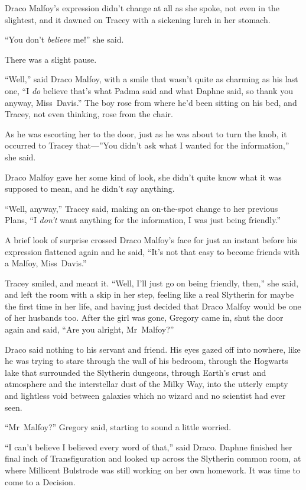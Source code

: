Draco Malfoy’s expression didn’t change at all as she spoke, not even in the
slightest, and it dawned on Tracey with a sickening lurch in her stomach.

“You don’t \emph{believe} me!” she said.

There was a slight pause.

“Well,” said Draco Malfoy, with a smile that wasn’t quite as charming as his
last one, “I \emph{do} believe that’s what Padma said and what Daphne said, so
thank you anyway, Miss~Davis.” The boy rose from where he’d been sitting on his
bed, and Tracey, not even thinking, rose from the chair.

As he was escorting her to the door, just as he was about to turn the knob, it
occurred to Tracey that—”You didn’t ask what I wanted for the information,”
she said.

Draco Malfoy gave her some kind of look, she didn’t quite know what it was
supposed to mean, and he didn’t say anything.

“Well, anyway,” Tracey said, making an on-the-spot change to her previous
Plans, “I \emph{don’t} want anything for the information, I was just being
friendly.”

A brief look of surprise crossed Draco Malfoy’s face for just an instant before
his expression flattened again and he said, “It’s not that easy to become
friends with a Malfoy, Miss~Davis.”

Tracey smiled, and meant it. “Well, I’ll just go on being friendly, then,” she
said, and left the room with a skip in her step, feeling like a real Slytherin
for maybe the first time in her life, and having just decided that Draco Malfoy
would be one of her husbands too.
\later
After the girl was gone, Gregory came in, shut the door again and said, “Are
you alright, Mr~Malfoy?”

Draco said nothing to his servant and friend. His eyes gazed off into nowhere,
like he was trying to stare through the wall of his bedroom, through the
Hogwarts lake that surrounded the Slytherin dungeons, through Earth’s crust and
atmosphere and the interstellar dust of the Milky Way, into the utterly empty
and lightless void between galaxies which no wizard and no scientist had ever
seen.

“Mr~Malfoy?” Gregory said, starting to sound a little worried.

“I can’t believe I believed every word of that,” said Draco.
\later
Daphne finished her final inch of Transfiguration and looked up across the
Slytherin common room, at where Millicent Bulstrode was still working on her
own homework. It was time to come to a Decision.

